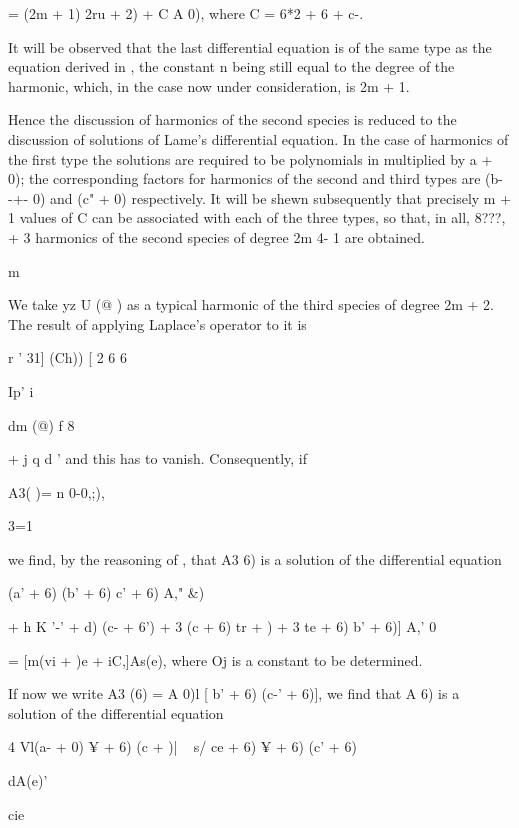 {= (2m + 1) 2ru + 2) + C A 0), where C = 6*2 + 6 + c-.

It will be observed that the last differential equation is of the same
type as the equation derived in , the constant n being still
equal to the degree of the harmonic, which, in the case now under
consideration, is 2m + 1.

Hence the discussion of harmonics of the second species is reduced to
the discussion of solutions of Lame's differential equation. In the
case of harmonics of the first type the solutions are required to be
polynomials in multiplied by \/ a + 0); the corresponding factors for
harmonics of the second and third types are \/(b- -+- 0) and (c" + 0)
respectively. It will be shewn subsequently that precisely m + 1
values of C can be associated with each of the three types, so that,
in all, 8???, + 3 harmonics of the second species of degree 2m 4- 1
are obtained.


m

We take yz U (@ ) as a typical harmonic of the third species of degree
2m + 2. The result of applying Laplace's operator to it is

r ' 31] (Ch)) [ 2 6 6

 Ip' i %

  dm (@) f 8 %

+ j q d%
' and this has to vanish. Consequently, if

A3( )= n 0-0,;),

3=1

%
%

we find, by the reasoning of , that A3 6) is a solution of the
differential equation

(a' + 6) (b' + 6) c' + 6) A," \&)

+ h K '-' + d) (c- + 6') + 3 (c + 6) tr + ) + 3 te + 6) b' + 6)] A,' 0

= [m(vi + )e + iC,]As(e), where Oj is a constant to be determined.

If now we write A3 (6) = A 0)l [ b' + 6) (c-' + 6)], we find that A 6)
is a solution of the differential equation

4 Vl(a- + 0) ¥ + 6) (c + )| ~ s/ ce + 6) ¥ + 6) (c' + 6)

dA(e)'

cie

}
